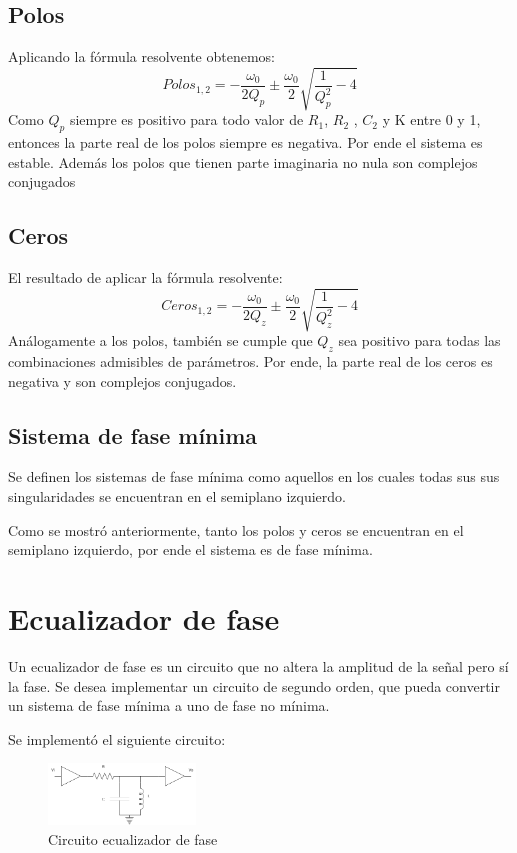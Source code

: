 \documentclass[../../tc_tp3_main.tex]{subfiles}
\begin{document}
\subsection{Polos}
Aplicando la f\'ormula resolvente obtenemos:
$$Polos_{1,2}=-\frac{\omega_0}{2 Q_p} \pm \frac{\omega_0}{2}\sqrt{\frac{1}{Q_p^2}-4}$$
Como $Q_p$ siempre es positivo para todo valor de $R_1$, $R_2$ , $C_2$ y K entre 0 y 1, entonces la parte real de los polos siempre es negativa. Por ende el sistema es estable. Además los polos que tienen parte imaginaria no nula son complejos conjugados
\subsection{Ceros}
El resultado de aplicar la f\'ormula resolvente:
$$Ceros_{1,2}=-\frac{\omega_0}{2 Q_z} \pm \frac{\omega_0}{2}\sqrt{\frac{1}{Q_z^2}-4}$$
Análogamente a los polos, también se cumple que $Q_z$ sea positivo para todas las combinaciones admisibles de par\'ametros. Por ende, la parte real de los ceros es negativa y son complejos conjugados.

\subsection{Sistema de fase mínima}

Se definen los sistemas de fase mínima como aquellos en los cuales todas sus sus singularidades se encuentran en el semiplano izquierdo.\par
Como se mostró anteriormente, tanto los polos y ceros se encuentran en el semiplano izquierdo, por ende el sistema es de fase mínima.

\section{Ecualizador de fase}

Un ecualizador de fase es un circuito que no altera la amplitud de la señal pero s\'i la fase.
Se desea implementar un circuito de segundo orden, que pueda convertir un sistema de fase mínima a uno de fase no mínima.
\par
Se implementó el siguiente circuito:
\begin{figure}[H]
\centering
\includegraphics[width=0.35\textwidth]{imagenes/eqFase.png}
\caption{Circuito ecualizador de fase} 
\end{figure}
\end{document}
